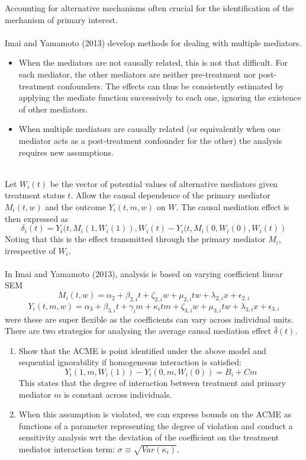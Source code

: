 \documentclass{article}
\begin{document}
	Accounting for alternative mechanisms often crucial for the identification of the mechanism of primary interest. 
	\\~\\
	Imai and Yamamoto (2013) develop methods for dealing with multiple mediators. 
	\begin{itemize}
		\item When the mediators are not causally related, this is not that difficult. For each mediator, the other mediators are neither pre-treatment nor post-treatment confounders. The effects can thus be consistently estimated by applying the mediate function successively to each one, ignoring the existence of other mediators.
		\item When multiple mediators are causally related (or equivalently when one mediator acts as a post-treatment confounder for the other) the analysis requires new assumptions. 
	\end{itemize}
	~\\
	Let $W_i(t)$ be the vector of potential values of alternative mediators given treatment status $t$. Allow the causal dependence of the primary mediator $M_i(t,w)$ and the outcome $Y_i(t,m,w)$ on $W$. The causal mediation effect is then expressed as 
	$$
	\delta_i(t) = Y_i(t, M_i(1, W_i(1)), W_i(t) - Y_i(t, M_i(0, W_i(0), W_i(t))
	$$
	Noting that this is the effect transmitted through the primary mediator $M_i$, irrespective of $W_i$. 
	\\~\\
	In Imai and Yamamoto (2013), analysis is based on varying coefficient linear SEM
	$$
	M_i(t,w) = \alpha_2 + \beta_{2,i}t + \zeta_{2,i} w + \mu_{2,i} t w + \lambda_{2,i} x + \epsilon_{2,i}
	$$
	$$
	Y_i(t,m,w) = \alpha_3 + \beta_{3,i}t + \gamma_i m + \kappa_i t m + \zeta_{3,i} w + \mu_{3,i}tw + \lambda_{3,i} x + \epsilon_{3,i}
	$$
	were these are super flexible as the coefficients can vary across individual units. There are two strategies for analysing the average causal mediation effect $\bar{\delta}(t)$.
	\begin{enumerate}
		\item Show that the ACME is point identified under the above model and sequential ignorability if homogeneous interaction is satisfied:
		$$
		Y_i(1,m,W_i(1)) - Y_i(0,m,W_i(0)) = B_i + Cm
		$$
		This states that the degree of interaction between treatment and primary mediator $m$ is constant across individuals.
		\item When this assumption is violated, we can express bounds on the ACME as functions of a parameter representing the degree of violation and conduct a sensitivity analysis wrt the deviation of the coefficient on the treatment mediator interaction term: $\sigma \equiv \sqrt{Var(\kappa_i)}$.
	\end{enumerate}
	
\end{document}
